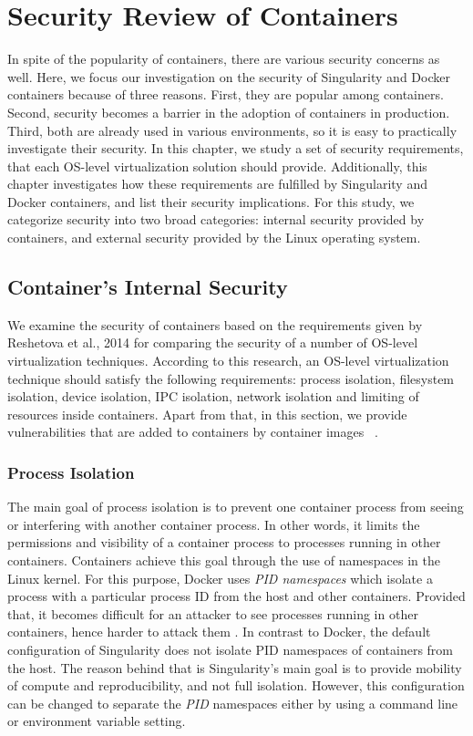 \chapter{Security Review of Containers}\label{chapter2}	
In spite of the popularity of containers, there are various security
concerns as well. Here, we focus our investigation on the security
of Singularity and Docker containers because of three reasons.
First, they are popular among containers.
Second, security becomes a barrier in the adoption of containers in
production. Third, both are already
used in various environments, so it is easy to practically
investigate their security. In this chapter, we study a set of security
requirements, that each OS-level virtualization solution should provide.
Additionally, this chapter investigates how these requirements are fulfilled
by Singularity and Docker containers, and list their security implications.
For this study, we categorize security into two broad categories: internal
security provided by containers, and external security
provided by the Linux operating system.

\section{Container's Internal Security}

We examine the security of containers based on the requirements given
by Reshetova et al., 2014 \cite{reshetova2014security} for comparing
the security of a number of OS-level virtualization techniques.
According to this research, an OS-level virtualization technique should
satisfy the following requirements: process isolation, filesystem isolation,
device isolation, IPC isolation, network isolation and limiting
of resources inside containers. Apart from that, in this section, we provide vulnerabilities
that are added to containers by container images ~\cite{cappos2008look, gummaraju2015over}.

\subsection{Process Isolation}

The main goal of process isolation is to prevent one container process
from seeing or interfering with another container process. In other words,
it limits the permissions and visibility of a container process to
processes running in other containers. Containers achieve this goal
through the use of namespaces in the Linux kernel. For this purpose,
Docker uses \textit{PID namespaces} which isolate a process with a
particular process ID from the host and other containers. Provided
that, it becomes difficult for an attacker to see processes running
in other containers, hence harder to attack them \cite{bui2015analysis}.
In contrast to Docker, the default configuration of Singularity does
not isolate PID namespaces of containers from the host.
The reason behind that is Singularity's main goal is to provide
mobility of compute and reproducibility, and not full isolation.
However, this configuration can be changed to separate the \textit{PID}
namespaces either by using a command line or environment variable setting.

